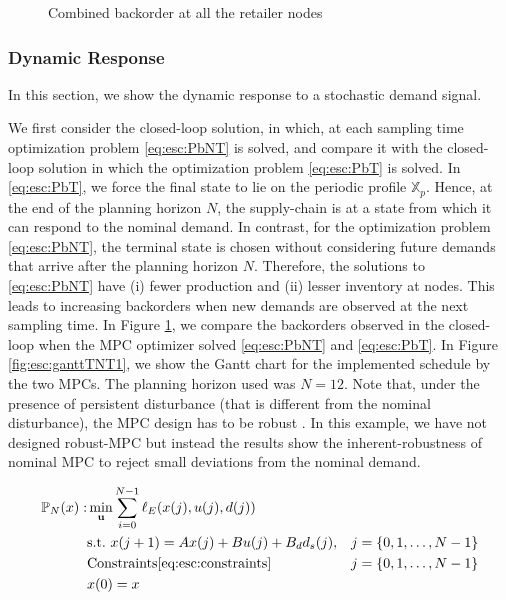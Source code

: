 \begin{figure}
\centering
\scriptsize
\resizebox{1\textwidth}{!}{}
\caption{Combined backorder at all the retailer nodes}
\label{fig:esc:BOTNT}
\end{figure}

\subsubsection{Dynamic Response}
In this section, we show the dynamic response to a stochastic demand
signal.

We first consider the closed-loop solution, in which, at each sampling
time optimization problem \eqref{eq:esc:PbNT} is solved, and compare it
with the closed-loop solution in which the optimization problem
\eqref{eq:esc:PbT} is solved. In \eqref{eq:esc:PbT}, we force the final state
to lie on the periodic profile $\mathbb{X}_p$. Hence, at the end of
the planning horizon $N$, the supply-chain is at a state from which it
can respond to the nominal demand. In contrast, for the optimization
problem \eqref{eq:esc:PbNT}, the terminal state is chosen without
considering future demands that arrive after the planning horizon
$N$. Therefore, the solutions to \eqref{eq:esc:PbNT} have (i) fewer
production and (ii) lesser inventory at nodes. This leads to
increasing backorders when new demands are observed at the next
sampling time. In Figure \ref{fig:esc:BOTNT}, we compare the backorders
observed in the closed-loop when the MPC optimizer solved
\eqref{eq:esc:PbNT} and \eqref{eq:esc:PbT}. In Figure \ref{fig:esc:ganttTNT1}, we
show the Gantt chart for the implemented schedule by the two MPCs. The
planning horizon used was $N = 12$. Note that, under the presence of
persistent disturbance (that is different from the nominal
disturbance), the MPC design has to be robust
\citep[Ch 3.]{rawlings:mayne:2009}. In this example, we have not
designed robust-MPC but instead the results show the inherent-robustness of
nominal MPC to reject small deviations from the nominal
demand. 
 
\begin{alignat}{2}
\label{eq:esc:PbNT}
\mathbb{P}_N(x):& \min_{\mathbf{u}}
{\sum_{i=0}^{N-1}\ell_E(x(j),u(j),d(j))}& \nonumber \\
&\text{s.t.~} x(j+1) = Ax(j) + Bu(j)+B_dd_s(j),&j = \left\lbrace 0,1,\ldots,N-1 \right\rbrace\\\
& \text{Constraints}\eqref{eq:esc:constraints}&j = \left\lbrace 0,1,\ldots,N-1 \right\rbrace \nonumber\\
& x(0) = x \nonumber\\
\end{alignat}

